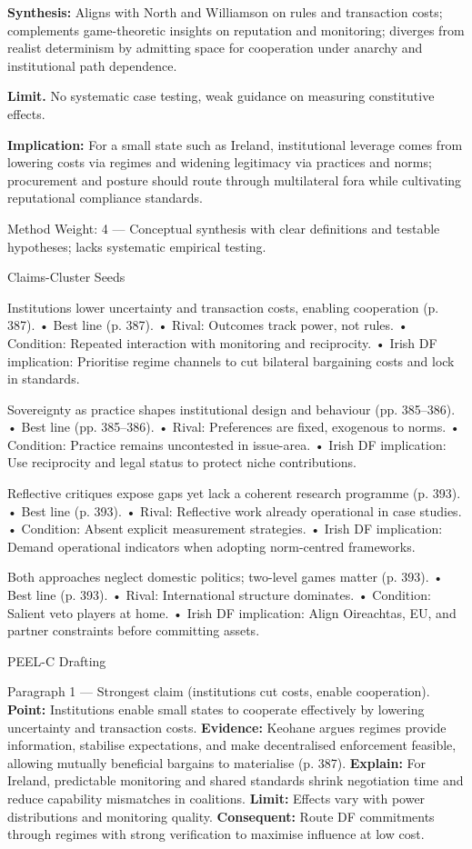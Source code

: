 \textbf{Synthesis:} Aligns with North and Williamson on rules and transaction costs; complements game-theoretic insights on reputation and monitoring; diverges from realist determinism by admitting space for cooperation under anarchy and institutional path dependence.

\textbf{Limit.} No systematic case testing, weak guidance on measuring constitutive effects.

\textbf{Implication:} For a small state such as Ireland, institutional leverage comes from lowering costs via regimes and widening legitimacy via practices and norms; procurement and posture should route through multilateral fora while cultivating reputational compliance standards.

Method Weight: 4 — Conceptual synthesis with clear definitions and testable hypotheses; lacks systematic empirical testing.

Claims-Cluster Seeds

Institutions lower uncertainty and transaction costs, enabling cooperation (p. 387).
• Best line (p. 387).
• Rival: Outcomes track power, not rules.
• Condition: Repeated interaction with monitoring and reciprocity.
• Irish DF implication: Prioritise regime channels to cut bilateral bargaining costs and lock in standards.

Sovereignty as practice shapes institutional design and behaviour (pp. 385–386).
• Best line (pp. 385–386).
• Rival: Preferences are fixed, exogenous to norms.
• Condition: Practice remains uncontested in issue-area.
• Irish DF implication: Use reciprocity and legal status to protect niche contributions.

Reflective critiques expose gaps yet lack a coherent research programme (p. 393).
• Best line (p. 393).
• Rival: Reflective work already operational in case studies.
• Condition: Absent explicit measurement strategies.
• Irish DF implication: Demand operational indicators when adopting norm-centred frameworks.

Both approaches neglect domestic politics; two-level games matter (p. 393).
• Best line (p. 393).
• Rival: International structure dominates.
• Condition: Salient veto players at home.
• Irish DF implication: Align Oireachtas, EU, and partner constraints before committing assets.

PEEL-C Drafting

Paragraph 1 — Strongest claim (institutions cut costs, enable cooperation).
\textbf{Point:} Institutions enable small states to cooperate effectively by lowering uncertainty and transaction costs. \textbf{Evidence:} Keohane argues regimes provide information, stabilise expectations, and make decentralised enforcement feasible, allowing mutually beneficial bargains to materialise (p. 387). \textbf{Explain:} For Ireland, predictable monitoring and shared standards shrink negotiation time and reduce capability mismatches in coalitions. \textbf{Limit:} Effects vary with power distributions and monitoring quality. \textbf{Consequent:} Route DF commitments through regimes with strong verification to maximise influence at low cost.

